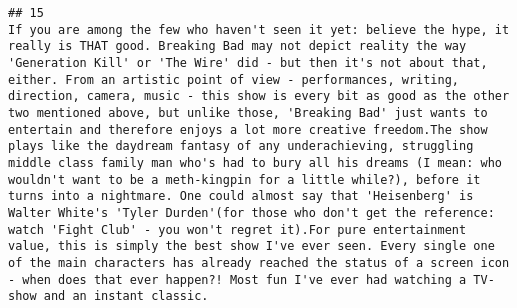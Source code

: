 \documentclass[
]{article}
\begin{document}
\begin{verbatim}
## 15                                                                                                                                                                                                                                                                                                                                                                                                                                                                                                                                                                                                                                                                                                                                                                                                                                                                                                                                                                                                                                                       If you are among the few who haven't seen it yet: believe the hype, it really is THAT good. Breaking Bad may not depict reality the way 'Generation Kill' or 'The Wire' did - but then it's not about that, either. From an artistic point of view - performances, writing, direction, camera, music - this show is every bit as good as the other two mentioned above, but unlike those, 'Breaking Bad' just wants to entertain and therefore enjoys a lot more creative freedom.The show plays like the daydream fantasy of any underachieving, struggling middle class family man who's had to bury all his dreams (I mean: who wouldn't want to be a meth-kingpin for a little while?), before it turns into a nightmare. One could almost say that 'Heisenberg' is Walter White's 'Tyler Durden'(for those who don't get the reference: watch 'Fight Club' - you won't regret it).For pure entertainment value, this is simply the best show I've ever seen. Every single one of the main characters has already reached the status of a screen icon - when does that ever happen?! Most fun I've ever had watching a TV-show and an instant classic.

\end{verbatim}
\end{document}
